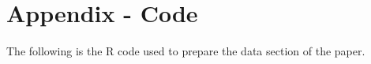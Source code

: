 \section{Appendix - Code}

The following is the R code used to prepare the data section of the paper.

%


